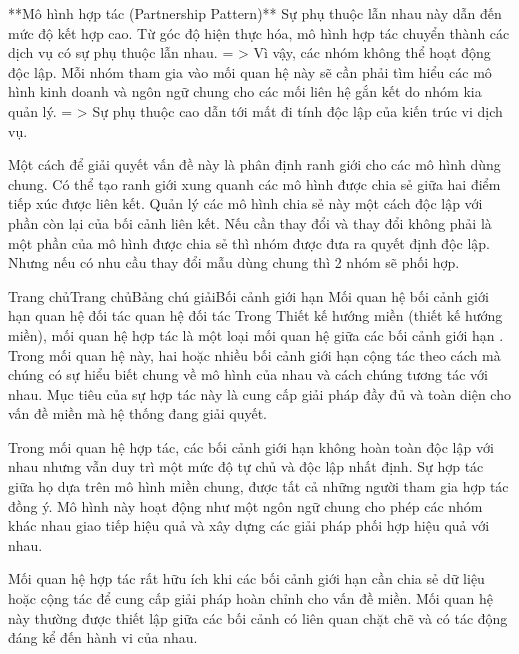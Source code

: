 **Mô hình hợp tác (Partnership Pattern)**
Sự phụ thuộc lẫn nhau này dẫn đến mức độ kết hợp cao.
Từ góc độ hiện thực hóa, mô hình hợp tác chuyển thành các dịch vụ có sự phụ thuộc lẫn nhau.
= > Vì vậy, các nhóm không thể hoạt động độc lập.
Mỗi nhóm tham gia vào mối quan hệ này sẽ cần phải tìm hiểu các mô hình kinh doanh và ngôn ngữ chung cho các mối liên hệ gắn kết do nhóm kia quản lý.
= > Sự phụ thuộc cao dẫn tới mất đi tính độc lập của kiến trúc vi dịch vụ.

Một cách để giải quyết vấn đề này là phân định ranh giới cho các mô hình dùng chung.
Có thể tạo ranh giới xung quanh các mô hình được chia sẻ giữa hai điểm tiếp xúc được liên kết.
Quản lý các mô hình chia sẻ này một cách độc lập với phần còn lại của bối cảnh liên kết.
Nếu cần thay đổi và thay đổi không phải là một phần của mô hình được chia sẻ thì nhóm được đưa ra quyết định độc lập.
Nhưng nếu có nhu cầu thay đổi mẫu dùng chung thì 2 nhóm sẽ phối hợp.


Trang chủTrang chủBảng chú giảiBối cảnh giới hạn Mối quan hệ bối cảnh giới hạn quan hệ đối tác
quan hệ đối tác
Trong Thiết kế hướng miền (thiết kế hướng miền), mối quan hệ hợp tác là một loại mối quan hệ giữa các bối cảnh giới hạn . Trong mối quan hệ này, hai hoặc nhiều bối cảnh giới hạn cộng tác theo cách mà chúng có sự hiểu biết chung về mô hình của nhau và cách chúng tương tác với nhau. Mục tiêu của sự hợp tác này là cung cấp giải pháp đầy đủ và toàn diện cho vấn đề miền mà hệ thống đang giải quyết.

Trong mối quan hệ hợp tác, các bối cảnh giới hạn không hoàn toàn độc lập với nhau nhưng vẫn duy trì một mức độ tự chủ và độc lập nhất định. Sự hợp tác giữa họ dựa trên mô hình miền chung, được tất cả những người tham gia hợp tác đồng ý. Mô hình này hoạt động như một ngôn ngữ chung cho phép các nhóm khác nhau giao tiếp hiệu quả và xây dựng các giải pháp phối hợp hiệu quả với nhau.

Mối quan hệ hợp tác rất hữu ích khi các bối cảnh giới hạn cần chia sẻ dữ liệu hoặc cộng tác để cung cấp giải pháp hoàn chỉnh cho vấn đề miền. Mối quan hệ này thường được thiết lập giữa các bối cảnh có liên quan chặt chẽ và có tác động đáng kể đến hành vi của nhau.

